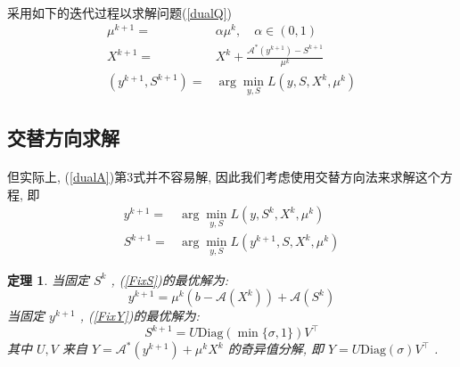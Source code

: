 \documentclass[a4paper, UTF8]{ctexart}				%
\newtheorem{theo}{\bf 定理}[section]			  %
\numberwithin{equation}{section}				%
\begin{document}
			\paragraph{}
				\quad 采用如下的迭代过程以求解问题(\ref{dualQ})
				\begin{equation}
					\begin{split}\label{dualA}
							\mu^{k + 1}
						=	& \alpha \mu^k, \quad \alpha \in (0,1)\\
							X^{k + 1}
						=	& X^k + \frac{\mathcal{A}^*(y^{k + 1}) - S^{k + 1}}{\mu^k}\\
							(y^{k + 1}, S^{k + 1}) 
						=	& \arg \min_{y, S}L(y, S, X^k, \mu^k)
					\end{split}
				\end{equation}
		\subsection{交替方向求解}
			\paragraph{}
				\quad 但实际上, (\ref{dualA})第3式并不容易解, 因此我们考虑使用交替方向法来求解这个方程, 即
				\begin{align}
						y^{k + 1}
					=	& \arg \min_{y, S}L(y, S^k, X^k, \mu^k) \label{FixS}\\
						S^{k + 1}
					=	& \arg \min_{y, S}L(y^{k + 1}, S, X^k, \mu^k) \label{FixY}
				\end{align}
			
			\begin{theo}
				当固定 $S^k$ , (\ref{FixS})的最优解为:
					\begin{equation}\label{dualAY}
						y^{k + 1} = \mu^k(b - \mathcal{A}(X^k)) + \mathcal{A}(S^k)
					\end{equation}
				当固定 $y^{k + 1}$ , (\ref{FixY})的最优解为:
					\begin{equation}\label{dualAS}
						S^{k + 1} = U \text{Diag}(\min \{\sigma, 1\}) V^\top
					\end{equation}
				其中 $U, V$ 来自 $Y = \mathcal{A}^*(y^{k + 1}) + \mu^k X^k$ 的奇异值分解, 即 $Y = U \text{Diag}(\sigma) V^\top$ .
			\end{theo}
\end{document}
